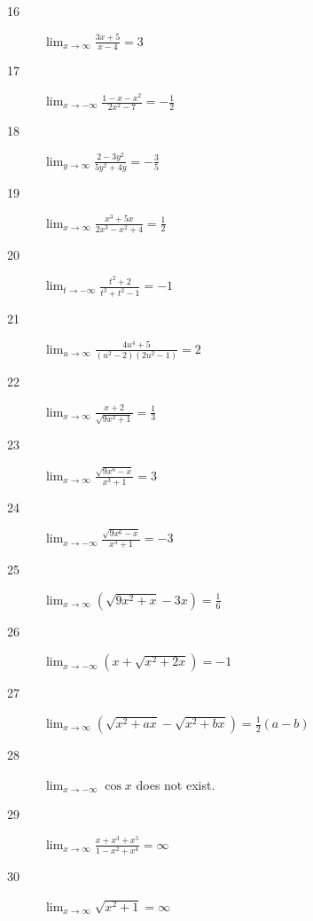 \documentclass[letterpaper, landscape]{exam}
\begin{document}
\begin{description}
      \item[16] 
        $\lim_{x \to \infty} \frac{3x + 5}{x - 4} = \boxed{ 3 }$

      \item[17] 
        $\lim_{x \to -\infty} \frac{1 - x - x^2}{2x^2 - 7} = \boxed{ - \frac{1}{2} }$

      \item[18] 
        $\lim_{y \to \infty} \frac{2 - 3y^2}{5y^2 + 4y} = \boxed{ - \frac{3}{5} }$

      \item[19] 
        $\lim_{x \to \infty} \frac{x^3 + 5x}{2x^3 - x^2 + 4} = \boxed{ \frac{1}{2} }$

      \item[20] 
        $\lim_{t \to -\infty} \frac{t^2 + 2}{t^3 + t^2 - 1} = \boxed{ -1 }$

      \item[21] 
        $\lim_{u \to \infty} \frac{4u^4 + 5}{\left(u^2 - 2 \right) \left(2u^2 - 1 \right)} 
          = \boxed{ 2 }$

      \item[22] 
        $\lim_{x \to \infty} \frac{x + 2}{\sqrt{9x^2 + 1}} = \boxed{ \frac{1}{3} }$

      \item[23] 
        $\lim_{x \to \infty} \frac{\sqrt{9x^6 - x}}{x^3 + 1} = \boxed{ 3 }$

      \item[24] 
        $\lim_{x \to -\infty} \frac{\sqrt{9x^6 - x}}{x^3 + 1} = \boxed{ -3 }$

      \item[25] 
        $\lim_{x \to \infty} \left( \sqrt{9x^2 + x} - 3x \right) 
          = \boxed{ \frac{1}{6} }$

      \item[26] 
        $\lim_{x \to -\infty} \left( x + \sqrt{x^2 + 2x} \right) = \boxed{ -1 }$

      \item[27] 
        $\lim_{x \to \infty} \left( \sqrt{x^2 + ax} - \sqrt{x^2 + bx} \right) 
          = \boxed{ \frac{1}{2} (a - b) }$

      \item[28] 
        $\lim_{x \to -\infty} \cos x$ does not exist.

      \item[29] 
        $\lim_{x \to \infty} \frac{x + x^3 + x^5}{1 - x^2 + x^4} = \boxed{ \infty }$

      \item[30] 
        $\lim_{x \to \infty} \sqrt{x^2 + 1} = \boxed{ \infty }$


\end{description}
\end{document}
